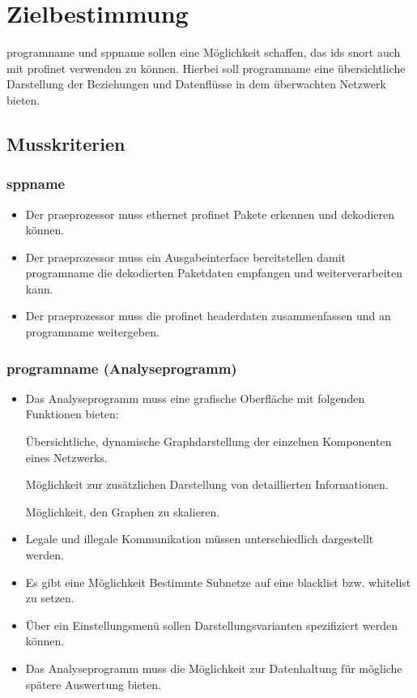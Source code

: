 \chapter{Zielbestimmung}

\gls{programname} und \gls{sppname} sollen eine Möglichkeit schaffen, das \gls{ids} \gls{snort} auch mit \gls{profinet} verwenden zu können.
Hierbei soll \gls{programname} eine übersichtliche Darstellung der Beziehungen und Datenflüsse in dem überwachten Netzwerk bieten.

\section{Musskriterien}

\subsection{\gls{sppname}}

\begin{itemize}
\item Der \gls{praeprozessor} muss \gls{ethernet} \gls{profinet} Pakete erkennen und dekodieren können.

\item Der \gls{praeprozessor} muss ein Ausgabeinterface bereitstellen damit \gls{programname} die dekodierten Paketdaten empfangen und weiterverarbeiten kann.

\item Der \gls{praeprozessor} muss die \gls{profinet} \gls{headerdaten} zusammenfassen und an \gls{programname} weitergeben.
\end{itemize}

\subsection{\gls{programname} (Analyseprogramm)}

\begin{itemize}
\item Das Analyseprogramm muss eine grafische Oberfläche mit folgenden Funktionen bieten:

    \subitem Übersichtliche, dynamische Graphdarstellung der einzelnen Komponenten eines Netzwerks.

    \subitem Möglichkeit zur zusätzlichen Darstellung von detaillierten Informationen.

    \subitem Möglichkeit, den Graphen zu skalieren.

\item Legale und illegale Kommunikation müssen unterschiedlich dargestellt werden.

\item Es gibt eine Möglichkeit Bestimmte Subnetze auf eine \gls{blacklist} bzw. \gls{whitelist} zu setzen.

\item Über ein Einstellungsmenü sollen Darstellungsvarianten spezifiziert werden können.

\item Das Analyseprogramm muss die Möglichkeit zur Datenhaltung für mögliche spätere Auswertung bieten.
\end{itemize}

